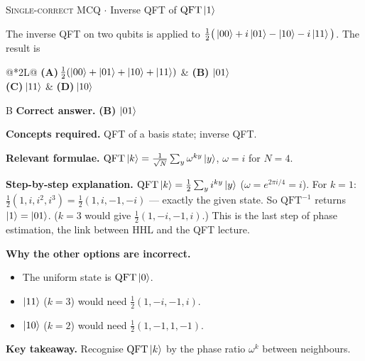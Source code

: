\documentclass[11pt,a4paper]{article}
\newcommand{\optlabel}[1]{\textbf{(#1)}}
\newcommand{\correctlabel}[1]{\textcolor{okgreen}{\textbf{(#1)}\,\ding{51}}}
\newenvironment{qitem}[1]{\begin{list}{}{\setlength{\leftmargin}{3.3em}\setlength{\labelwidth}{3.1em}%
  \setlength{\labelsep}{0.2em}\setlength{\topsep}{3pt}\setlength{\parsep}{3pt}}\item[\textbf{Q.#1}\hfill]}{\end{list}}
\newcommand{\qsep}{\par\vspace{2pt}{\color{black!15}\hrule}\vspace{4pt}}
\newcommand{\qmeta}[2]{{\footnotesize\color{black!60}\textsc{#1} \;$\cdot$\; #2}\par}
\begin{document}
\begin{qitem}{25}
\qmeta{Single-correct MCQ}{Inverse QFT of $\mathrm{QFT}\ket1$}
The inverse QFT on two qubits is applied to $\tfrac12\big(\ket{00} + i\ket{01} - \ket{10} - i\ket{11}\big)$. The result is
\par\smallskip\noindent\begin{tabularx}{\linewidth}{@{}*{2}{L}@{}}
\optlabel{A}\,$\tfrac12(\ket{00} + \ket{01} + \ket{10} + \ket{11})$ & \correctlabel{B}\,$\ket{01}$ \\[3pt]
\optlabel{C}\,$\ket{11}$ & \optlabel{D}\,$\ket{10}$
\end{tabularx}
\end{qitem}
\begin{solbox}{B}
\textbf{\color{brand}Correct answer.} \textcolor{okgreen}{\textbf{(B)}} $\ket{01}$

\textbf{\color{brand}Concepts required.} QFT of a basis state; inverse QFT.

\textbf{\color{brand}Relevant formulae.} $\mathrm{QFT}\ket k = \frac{1}{\sqrt N}\sum_y\omega^{ky}\ket y$, $\omega = i$ for $N = 4$.

\textbf{\color{brand}Step-by-step explanation.} $\mathrm{QFT}\ket k = \frac12\sum_y i^{ky}\ket y$ ($\omega = e^{2\pi i/4} = i$). For $k = 1$: $\frac12(1, i, i^2, i^3) = \frac12(1, i, -1, -i)$ --- exactly the given state. So
$\mathrm{QFT}^{-1}$ returns $\ket1 = \ket{01}$. ($k = 3$ would give $\frac12(1, -i, -1, i)$.) This is the last step of phase estimation, the link between HHL and the QFT lecture.

\textbf{\color{brand}Why the other options are incorrect.}
\begin{itemize}[leftmargin=2.4em, itemsep=1pt, topsep=2pt]
\item[\textbf{(A)}] The uniform state is $\mathrm{QFT}\ket0$.
\item[\textbf{(C)}] $\ket{11}$ ($k = 3$) would need $\frac12(1, -i, -1, i)$.
\item[\textbf{(D)}] $\ket{10}$ ($k = 2$) would need $\frac12(1, -1, 1, -1)$.
\end{itemize}
\textbf{\color{brand}Key takeaway.} Recognise $\mathrm{QFT}\ket k$ by the phase ratio $\omega^k$ between neighbours.
\end{solbox}
\qsep
\end{document}
